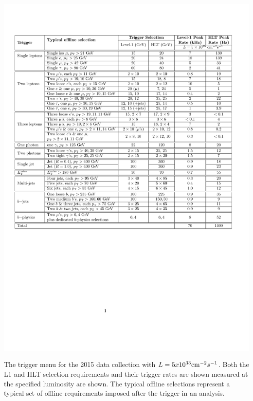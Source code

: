 \begin{table}[hbtp]
\centering
\includegraphics[width=\textwidth]{figures/trigger_menu.pdf}
\caption{The trigger menu for the 2015 data collection with $L = 5 x 10^{33}\mathrm{cm}^{-2}s^{-1}$. Both the L1 and \ac{HLT} selection requirements and their trigger rates are shown measured at the specified luminosity are shown. The typical offline selections represent a typical set of offline requirements imposed after the trigger in an analysis.}
\label{tab:trigger_menu}
\end{table}

